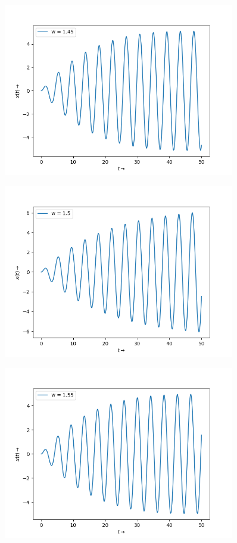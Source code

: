 \documentclass[10pt,a4paper]{article}
\begin{document}
\begin{figure}[!tbh]

\includegraphics[width = 0.9\textwidth]{3b.png}

\end{figure}

\begin{figure}[!tbh]

\includegraphics[width = 0.9\textwidth]{3c.png}

\end{figure}

\begin{figure}[!tbh]

\includegraphics[width = 0.9\textwidth]{3d.png}

\end{figure}
\end{document}
